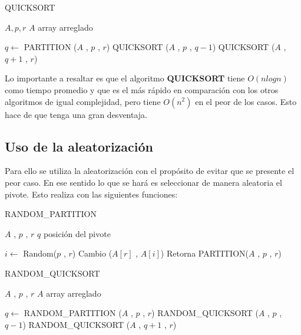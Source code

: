 \documentclass[final,a4paper,romanappendices]{IEEEtran}\usepackage[]{graphicx}\usepackage[]{color}
\theoremstyle{definition}
\begin{document}
\begin{algorithm}[ht]
	\caption{QUICKSORT}
	\begin{algorithmic}[1]
		
		\Require $A,p,r$
		\Ensure $A$ array arreglado
		
			\State $q \gets $ PARTITION ($A$ , $p$ , $r$)
			\State QUICKSORT ($A$ , $p$ , $q-1$)
			\State QUICKSORT ($A$ , $q+1$ , $r$)
		\EndIf

	\end{algorithmic}
\end{algorithm}

Lo importante a resaltar es que el algoritmo {\bf{QUICKSORT}} tiene $O(nlogn)$ como tiempo promedio y que es el más rápido en comparación con los otros algoritmos de igual complejidad, pero tiene $O(n^2)$ en el peor de los casos. Esto hace de que tenga una gran desventaja.

\subsection{Uso de la aleatorización}

Para ello se utiliza la aleatorización con el propósito de evitar que se presente el peor caso. En ese sentido lo que se hará es seleccionar de manera aleatoria el pivote. Esto realiza con las siguientes funciones: 

\begin{algorithm}[ht]
	\caption{RANDOM\_PARTITION}
	\begin{algorithmic}[1]
		
		\Require $A$ , $p$ , $r$
		\Ensure $q$ posición del pivote
		
		\State $i \gets $ Random($p$ , $r$)
		\State Cambio ($A[r]$ , $A[i]$)
		\State Retorna PARTITION($A$ , $p$ , $r$)
		
	\end{algorithmic}
\end{algorithm}

\begin{algorithm}[ht]
	\caption{RANDOM\_QUICKSORT}
	\begin{algorithmic}[1]
		
		\Require $A$ , $p$ , $r$
		\Ensure $A$ array arreglado
		
		\If{ $p < r$ }
			\State $q \gets $ RANDOM\_PARTITION ($A$ , $p$ , $r$)
			\State RANDOM\_QUICKSORT ($A$ , $p$ , $q-1$)
			\State RANDOM\_QUICKSORT ($A$ , $q+1$ , $r$)
		\EndIf
		
	\end{algorithmic}
\end{algorithm}
\end{document}

